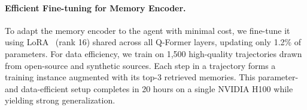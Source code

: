 \documentclass{article} %
\begin{document}
\paragraph{Efficient Fine-tuning for Memory Encoder.}
To adapt the memory encoder to the agent with minimal cost, we fine-tune it using LoRA~\citep{hu2021lora} (rank 16) shared across all Q-Former \citep{qformer} layers, updating only 1.2\% of parameters. For data efficiency, we train on 1,500 high-quality trajectories drawn from open-source and synthetic sources. Each step in a trajectory forms a training instance augmented with its top-3 retrieved memories. This parameter- and data-efficient setup completes in 20 hours on a single NVIDIA H100 while yielding strong generalization.







\end{document}
